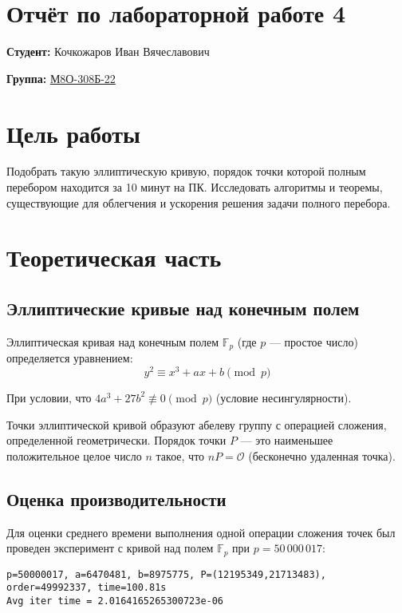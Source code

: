 \documentclass[a4paper,12pt]{article}
\begin{document}
\section*{Отчёт по лабораторной работе 4}

\bigskip

\textbf{Студент:} Кочкожаров Иван Вячеславович

\noindent
\textbf{Группа:} \underline{М8О-308Б-22}

\bigskip

\section{Цель работы}
Подобрать такую эллиптическую кривую, порядок точки которой полным перебором находится за 10 минут на ПК. Исследовать алгоритмы и теоремы, существующие для облегчения и ускорения решения задачи полного перебора.

\section{Теоретическая часть}

\subsection{Эллиптические кривые над конечным полем}
Эллиптическая кривая над конечным полем $\mathbb{F}_p$ (где $p$ — простое число) определяется уравнением:
\begin{equation}
y^2 \equiv x^3 + ax + b \pmod{p}
\end{equation}

При условии, что $4a^3 + 27b^2 \not\equiv 0 \pmod{p}$ (условие несингулярности).

Точки эллиптической кривой образуют абелеву группу с операцией сложения, определенной геометрически. Порядок точки $P$ — это наименьшее положительное целое число $n$ такое, что $nP = \mathcal{O}$ (бесконечно удаленная точка).

\subsection{Оценка производительности}

Для оценки среднего времени выполнения одной операции сложения точек был проведен эксперимент с кривой над полем $\mathbb{F}_p$ при $p = 50\,000\,017$:

\begin{lstlisting}
p=50000017, a=6470481, b=8975775, P=(12195349,21713483), order=49992337, time=100.81s
Avg iter time = 2.0164165265300723e-06
\end{lstlisting}
\end{document}
